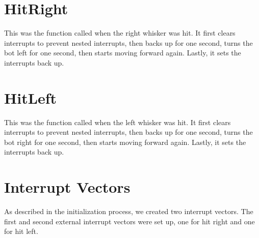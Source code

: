 \documentclass[12pt,letterpaper]{article}
\begin{document}
\section{HitRight}
This was the function called when the right whisker was hit. It first clears interrupts to prevent nested interrupts, then backs up for one second, turns the bot left for one second, then starts moving forward again. Lastly, it sets the interrupts back up.

\section{HitLeft}
This was the function called when the left whisker was hit. It first clears interrupts to prevent nested interrupts, then backs up for one second, turns the bot right for one second, then starts moving forward again. Lastly, it sets the interrupts back up.

\section{Interrupt Vectors}
As described in the initialization process, we created two interrupt vectors. The first and second external interrupt vectors were set up, one for hit right and one for hit left.
\end{document}

